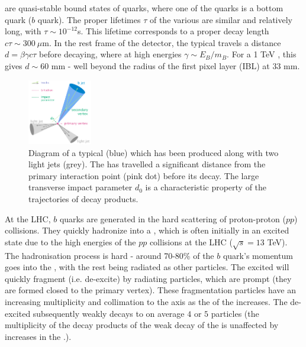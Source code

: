 \bhadrons are quasi-stable bound states of quarks, where one of the quarks is a bottom quark ($b$ quark). The proper lifetimes $\tau$ of the various \bhadrons are similar and relatively long, with $\tau \sim 10^{-12}$s. This lifetime corresponds to a proper decay length $c \tau \sim 300 ~\mu$m. In the rest frame of the detector, the typical \bhadron travels a distance $d = \beta\gamma c \tau$ before decaying, where at high energies $\gamma \sim E_B/m_B$. For a 1 TeV \bhadron, this gives $d \sim 60$ mm - well beyond the radius of the first pixel layer (IBL) at 33 mm.
%   
\begin{figure}[!hb]
    \centering
    \includegraphics[width=0.25\textwidth]{chapters/3.tracking/figs/b-jet-diagram.png}
    \caption{Diagram of a typical \bjet (blue) which has been produced along with two light jets (grey). The \bhadron has travelled a significant distance from the primary interaction point (pink dot) before its decay. The large transverse impact parameter $d_0$ is a characteristic property of the trajectories of \bhadron decay products.}
    \label{fig:b-jet topology}
\end{figure}
%
At the LHC, $b$ quarks are generated in the hard scattering of proton-proton ($pp$) collisions. They quickly hadronize into a \bhadron, which is often initially in an excited state due to the high energies of the $pp$ collisions at the LHC ($\sqrt{s} = 13$ TeV). The hadronisation process is hard - around 70-80\% of the $b$ quark's momentum goes into the \bhadron, with the rest being radiated as other particles. The excited \bhadron will quickly fragment (i.e. de-excite) by radiating particles, which are prompt (they are formed closed to the primary vertex). These fragmentation particles have an increasing multiplicity and collimation to the \bhadron axis as the \pT of the \bhadron increases. The de-excited \bhadron subsequently weakly decays to on average $4$ or $5$ particles (the multiplicity of the decay products of the weak decay of the \bhadron is unaffected by increases in the \bhadron \pT.). 


